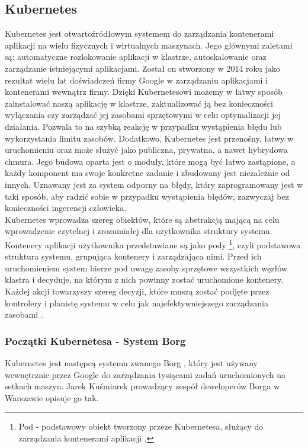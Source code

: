 \documentclass[12pt]{report}
\let\Oldsubsection\subsection
\renewcommand{\subsection}{\FloatBarrier\Oldsubsection}
\let\Oldsubsubsection\subsubsection
\renewcommand{\subsubsection}{\FloatBarrier\Oldsubsubsection}
\begin{document}
\subsection{Kubernetes}
Kubernetes jest otwartoźródłowym systemem do zarządzania kontenerami aplikacji na wielu fizycznych i wirtualnych maszynach. Jego głównymi zaletami są: automatyczne rozlokowanie aplikacji w klastrze, autoskalowanie oraz zarządzanie istniejącymi aplikacjami. Został on stworzony w 2014 roku jako rezultat wielu lat doświadczeń firmy Google w zarządzaniu aplikacjami i kontenerami wewnątrz firmy. Dzięki Kubernetesowi możemy w łatwy sposób zainstalować naszą aplikację w klastrze, zaktualizować ją bez konieczności wyłączania czy zarządzać jej zasobami sprzętowymi w celu optymalizacji jej działania. Pozwala to na szybką reakcję w przypadku wystąpienia błędu lub wykorzystania limitu zasobów. Dodatkowo, Kubernetes jest przenośny, łatwy w uruchomieniu oraz może służyć jako publiczna, prywatna, a nawet hybrydowa chmura. Jego budowa oparta jest o moduły, które mogą być łatwo zastąpione, a każdy komponent ma swoje konkretne zadanie i zbudowany jest niezależnie od innych. Uznawany jest za system odporny na błędy, który zaprogramowany jest w taki sposób, aby radzić sobie w przypadku wystąpienia błędów, zazwyczaj bez konieczności ingerencji człowieka. \\
	\indent Kubernetes wprowadza szereg obiektów, które są abstrakcją mającą na celu wprowadzenie czytelnej i zrozumiałej dla użytkownika struktury systemu. Kontenery aplikacji użytkownika przedstawiane są jako pody \footnote{Pod - podstawowy obiekt tworzony przeze Kubernetesa, służący do zarządzania kontenerami aplikacji \cite{kubernetes}.}, czyli podstawowa struktura systemu, grupująca kontenery i zarządzająca nimi. Przed ich uruchomieniem system bierze pod uwagę zasoby sprzętowe wszystkich węzłów klastra i decyduje, na którym z nich powinny zostać uruchomione kontenery. Każdej akcji towarzyszy szereg decyzji, które muszą zostać podjęte przez kontrolery i planistę systemu w celu jak najefektywniejszego zarządzania zasobami \cite{kubernetes}.
\subsubsection{Początki Kubernetesa - System Borg}
Kubernetes jest następcą systemu zwanego Borg \cite{borg}, który jest używany wewnętrznie przez Google do zarządzania tysiącami zadań uruchomionych na setkach maszyn. Jarek Kuśmiarek prowadzący zespół deweloperów Borga w Warszawie opisuje go tak.
\end{document}
